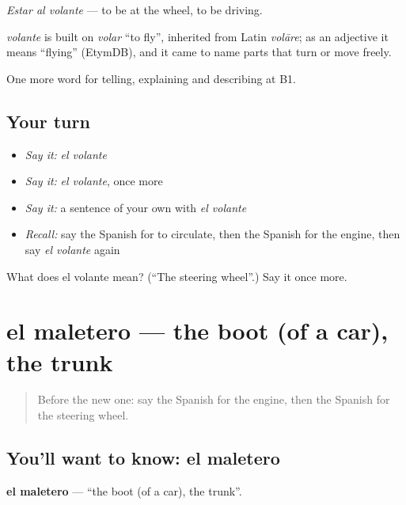 \emph{Estar al volante} — to be at the wheel, to be driving.

\begin{cousinweb}
\emph{volante} is built on \emph{volar} \textquotedblleft{}to fly\textquotedblright{}, inherited from Latin \emph{volāre}; as an adjective it means \textquotedblleft{}flying\textquotedblright{} (EtymDB), and it came to name parts that turn or move freely.
\end{cousinweb}

\begin{grammarlens}[title={What you've built}]
One more word for telling, explaining and describing at B1.
\end{grammarlens}

\subsection*{Your turn}
\begin{itemize}
\raggedright
  \item \emph{Say it:} \emph{el volante}
  \item \emph{Say it:} \emph{el volante}, once more
  \item \emph{Say it:} a sentence of your own with \emph{el volante}
  \item \emph{Recall:} say the Spanish for to circulate, then the Spanish for the engine, then say \emph{el volante} again
\end{itemize}

\begin{tcolorbox}[breakable,colback=teal!4,colframe=teal!35!black,title={Before you move on}]
What does el volante mean? (\textquotedblleft{}The steering wheel\textquotedblright{}.) Say it once more.
\end{tcolorbox}
\section[el maletero]{el maletero — the boot (of a car), the trunk}

\label{lesson:ES-C644-maletero}



\begin{quote}
Before the new one: say the Spanish for the engine, then the Spanish for the steering wheel.
\end{quote}

\subsection*{You'll want to know: el maletero}
\textbf{el maletero} — \textquotedblleft{}the boot (of a car), the trunk\textquotedblright{}.

